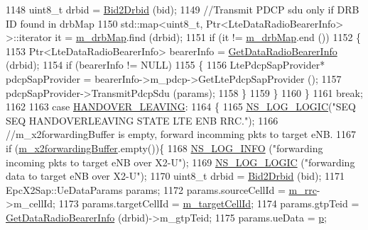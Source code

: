 \begin{DoxyCode}
1148         uint8\_t drbid = \hyperlink{classns3_1_1UeManager_ac8c03e2c3f2bbb67f9c13df62e6464b5}{Bid2Drbid} (bid);
1149         \textcolor{comment}{//Transmit PDCP sdu only if DRB ID found in drbMap}
1150         std::map<uint8\_t, Ptr<LteDataRadioBearerInfo> >::iterator it = \hyperlink{classns3_1_1UeManager_a18499c025730b63c73e5d93effff57aa}{m\_drbMap}.find (drbid);
1151         \textcolor{keywordflow}{if} (it != \hyperlink{classns3_1_1UeManager_a18499c025730b63c73e5d93effff57aa}{m\_drbMap}.end ())
1152           \{
1153             Ptr<LteDataRadioBearerInfo> bearerInfo = \hyperlink{classns3_1_1UeManager_a8f8a1bcd11bcdfd6e17b72c6325a25b0}{GetDataRadioBearerInfo} (drbid);
1154             \textcolor{keywordflow}{if} (bearerInfo != NULL)
1155               \{
1156                 LtePdcpSapProvider* pdcpSapProvider = bearerInfo->m\_pdcp->GetLtePdcpSapProvider ();
1157         pdcpSapProvider->TransmitPdcpSdu (params);
1158               \}
1159           \}
1160       \}
1161       \textcolor{keywordflow}{break};
1162 
1163     \textcolor{keywordflow}{case} \hyperlink{classns3_1_1UeManager_a2f4085fdd18d7125c27da44a5b8b6808ae67953d7b8e117cbd2cab21a1fcde8ad}{HANDOVER\_LEAVING}:
1164       \{
1165         \hyperlink{group__logging_ga88acd260151caf2db9c0fc84997f45ce}{NS\_LOG\_LOGIC}(\textcolor{stringliteral}{"SEQ SEQ HANDOVERLEAVING STATE LTE ENB RRC."});
1166         \textcolor{comment}{//m\_x2forwardingBuffer is empty, forward incomming pkts to target eNB.}
1167         \textcolor{keywordflow}{if} (\hyperlink{classns3_1_1UeManager_a3fb8a9dc6ef434306f90f42837f3ae83}{m\_x2forwardingBuffer}.empty())\{
1168           \hyperlink{group__logging_gafbd73ee2cf9f26b319f49086d8e860fb}{NS\_LOG\_INFO} (\textcolor{stringliteral}{"forwarding incoming pkts to target eNB over X2-U"});
1169           \hyperlink{group__logging_ga88acd260151caf2db9c0fc84997f45ce}{NS\_LOG\_LOGIC} (\textcolor{stringliteral}{"forwarding data to target eNB over X2-U"});
1170           uint8\_t drbid = \hyperlink{classns3_1_1UeManager_ac8c03e2c3f2bbb67f9c13df62e6464b5}{Bid2Drbid} (bid);        
1171           EpcX2Sap::UeDataParams params;
1172           params.sourceCellId = \hyperlink{classns3_1_1UeManager_ab4405e9f354c66e7c1a4c95832290f5b}{m\_rrc}->m\_cellId;
1173           params.targetCellId = \hyperlink{classns3_1_1UeManager_a8a70641b8dfb0641e6cfcf4cc83083a3}{m\_targetCellId};
1174           params.gtpTeid = \hyperlink{classns3_1_1UeManager_a8f8a1bcd11bcdfd6e17b72c6325a25b0}{GetDataRadioBearerInfo} (drbid)->m\_gtpTeid;
1175           params.ueData = \hyperlink{lte__link__budget_8m_ac9de518908a968428863f829398a4e62}{p};

\end{DoxyCode}
